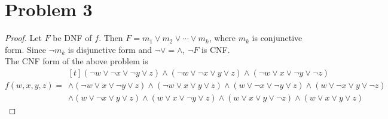 \section*{Problem 3}
	\begin{proof}
		Let $F$ be DNF of $f$. Then $F = m_1\vee m_2\vee\cdots\vee m_k$, where $m_k$ is conjunctive form. Since $\neg m_k$ is disjunctive form and $\neg\vee = \wedge$, $\neg F$ is CNF.\\
		The CNF form of the above problem is
		\begin{equation*}
			f(w,x,y,z)=\begin{multlined}[t]
				(\neg w\vee\neg x\vee\neg y\vee z)\wedge(\neg w\vee\neg x\vee y\vee z)\wedge(\neg w\vee x\vee \neg y\vee\neg z)\\
				\wedge(\neg w\vee x\vee\neg y\vee z)\wedge(\neg w\vee x\vee y\vee z)\wedge(w\vee\neg x\vee\neg y\vee z)\wedge(w\vee\neg x\vee y\vee\neg z)\\
				\wedge(w\vee\neg x\vee y\vee z)\wedge(w\vee x\vee\neg y\vee z)\wedge(w\vee x\vee y\vee\neg z)\wedge(w\vee x\vee y\vee z)
			\end{multlined}
		\end{equation*}
	\end{proof}